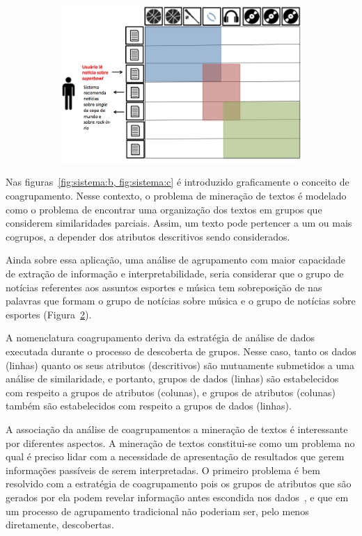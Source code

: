\documentclass[
    12pt,                %
    oneside,            %
    a4paper,            %
    english,            %
    brazil                %
    ]{abntex2ppgsi}
\begin{document}
\begin{figure} [htpb]
\begin{subfigure}[b]{0.45\textwidth}
        \includegraphics[width=\textwidth]{img/sistema2.png}
        \caption{}
        \label{fig:sistema:c}
    \end{subfigure}
\end{figure}

Nas figuras~\ref{fig:sistema:b, fig:sistema:c} é introduzido graficamente o conceito de coagrupamento.
Nesse contexto, o problema de mineração de textos é modelado como o problema de encontrar uma organização dos textos em grupos que considerem similaridades parciais.
Assim, um texto pode pertencer a um ou mais cogrupos, a depender dos atributos descritivos sendo considerados.

Ainda sobre essa aplicação, uma análise de agrupamento com maior capacidade de extração de informação e interpretabilidade, seria considerar que o grupo de notícias referentes aos assuntos esportes e música tem sobreposição de nas palavras que formam o grupo de notícias sobre música e o grupo de notícias sobre esportes (Figura~\ref{fig:sistema:c}).

A nomenclatura coagrupamento deriva da estratégia de análise de dados executada durante o processo de descoberta de grupos.
Nesse caso, tanto os dados (linhas) quanto os seus atributos (descritivos) são mutuamente submetidos a uma análise de similaridade, e portanto, grupos de dados (linhas) são estabelecidos com respeito a grupos de atributos (colunas), e grupos de atributos (colunas) também são estabelecidos com respeito a grupos de dados (linhas).

A associação da análise de coagrupamentos a mineração de textos é interessante por diferentes aspectos.
A mineração de textos constitui-se como um problema no qual é preciso lidar com a necessidade de apresentação de resultados que gerem informações passíveis de serem interpretadas.
O primeiro problema é bem resolvido com a estratégia de coagrupamento pois os grupos de atributos que são gerados por ela podem revelar informação antes escondida nos dados~\cite{Tjhi2009}, e que em um processo de agrupamento tradicional não poderiam ser, pelo menos diretamente, descobertas.
\end{document}
